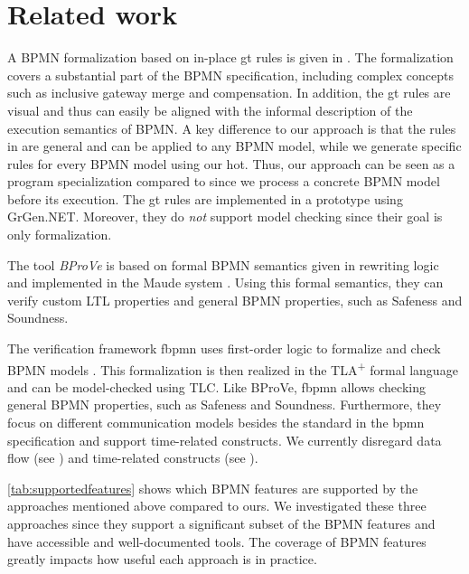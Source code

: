 \documentclass[runningheads]{llncs}
\begin{document}
\section{Related work} \label{sec:relatedWork}
A BPMN formalization based on in-place \gls*{gt} rules is given in \cite{vangorpVisualTokenbasedFormalization2013}.
The formalization covers a substantial part of the BPMN specification, including complex concepts such as inclusive gateway merge and compensation.
In addition, the \gls*{gt} rules are visual and thus can easily be aligned with the informal description of the execution semantics of BPMN.
A key difference to our approach is that the rules in \cite{vangorpVisualTokenbasedFormalization2013} are general and can be applied to any BPMN model, while we generate specific rules for every BPMN model using our \gls*{hot}.
Thus, our approach can be seen as a program specialization compared to \cite{vangorpVisualTokenbasedFormalization2013} since we process a concrete BPMN model before its execution.
The \gls*{gt} rules are implemented in a prototype using GrGen.NET.
Moreover, they do \textit{not} support model checking since their goal is only formalization.

The tool \textit{BProVe} is based on formal BPMN semantics given in rewriting logic and implemented in the Maude system \cite{corradiniFormalApproachAnalysis2021}.
Using this formal semantics, they can verify custom LTL properties and general BPMN properties, such as Safeness and Soundness.

The verification framework \textsf{fbpmn} uses first-order logic to formalize and check BPMN models \cite{houhouFirstOrderLogicSemantics2019,houhouFirstOrderLogicVerification2022}.
This formalization is then realized in the TLA\textsuperscript{+} formal language and can be model-checked using TLC.
Like BProVe, \textsf{fbpmn} allows checking general BPMN properties, such as Safeness and Soundness.
Furthermore, they focus on different communication models besides the standard in the \gls*{bpmn} specification and support time-related constructs.
We currently disregard data flow (see \cite{corradiniFormalisingAnimatingMultiple2022,el-saberCMMICMComplianceChecking2015}) and time-related constructs (see \cite{duranVerifyingTimedBPMN2017,houhouFirstOrderLogicVerification2022}).

\autoref{tab:supportedfeatures} shows which BPMN features are supported by the approaches mentioned above compared to ours.
We investigated these three approaches since they support a significant subset of the BPMN features and have accessible and well-documented tools.
The coverage of BPMN features greatly impacts how useful each approach is in practice.
\end{document}
